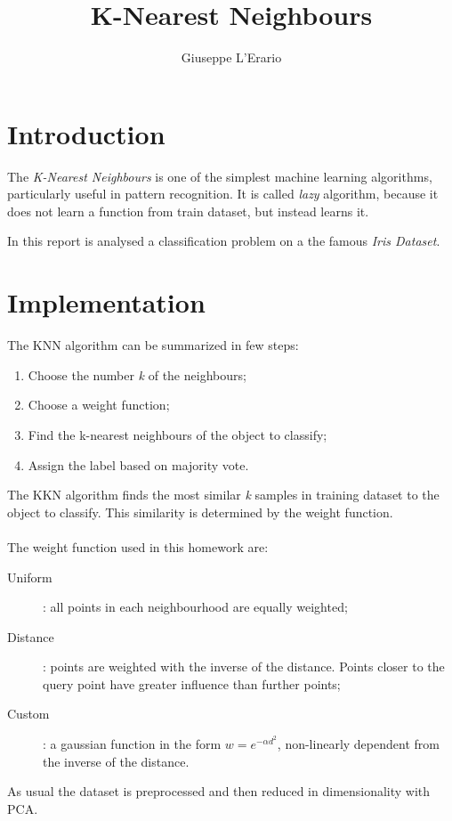\documentclass[10pt,a4paper]{article}
\author{Giuseppe L'Erario}
\date{}
\title{K-Nearest Neighbours}
\begin{document}
\maketitle

\section*{Introduction}
	The \emph{K-Nearest Neighbours} is one of the simplest machine learning algorithms, particularly useful in pattern recognition. It is called \emph{lazy} algorithm, because it does not learn a function from train dataset, but instead learns it. 
	
	In this report is analysed a classification problem on a the famous \emph{Iris Dataset}.
	
\section*{Implementation}
	The KNN algorithm can be summarized in few steps:
		\begin{enumerate}[leftmargin=3\parindent]
			\item Choose the number \emph{k} of the neighbours;
			\item Choose a weight function;
			\item Find the k-nearest neighbours of the object to classify;
			\item Assign the label based on majority vote.
		\end{enumerate}
	
	The KKN algorithm finds the most similar \emph{k} samples in training dataset to the object to classify. This similarity is determined by the weight function. \\ 
	\\ The weight function used in this homework are:
	\begin{description}
		\item[Uniform]: all points in each neighbourhood are equally weighted;
		\item[Distance]: points are weighted with the inverse of the distance. Points closer to the query point have greater influence than further points;
		\item[Custom]: a gaussian function in the form $w=e^{-\alpha d^2}$, non-linearly dependent from the inverse of the distance. 
	\end{description}
	
	As usual the dataset is preprocessed and then reduced in dimensionality with PCA.
	
\end{document}
